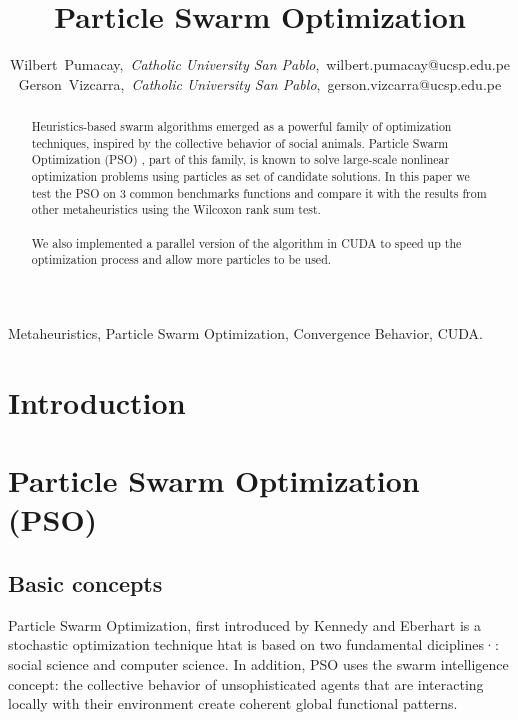 \documentclass[journal]{IEEEtran}
\begin{document}
\title{Particle Swarm Optimization}

\author{Wilbert~Pumacay,~\textit{Catholic University San Pablo},~wilbert.pumacay@ucsp.edu.pe\\
        Gerson~Vizcarra,~\textit{Catholic University San Pablo},~gerson.vizcarra@ucsp.edu.pe}

\maketitle

\begin{abstract}
Heuristics-based swarm algorithms emerged as a powerful family of optimization techniques, inspired by the collective behavior of social animals. Particle Swarm Optimization (PSO) , part of this family, is known to solve large-scale nonlinear optimization problems using particles as set of candidate solutions. In this paper we test the PSO on 3 common benchmarks functions and compare it with the results from other metaheuristics using the Wilcoxon rank sum test. 
\\
\\
We also implemented a parallel version of the algorithm in CUDA to speed up the optimization process and allow more particles to be used.
\end{abstract}

\begin{IEEEkeywords}
Metaheuristics, Particle Swarm Optimization, Convergence Behavior, CUDA.
\end{IEEEkeywords}


\section{Introduction}


\section{ Particle Swarm Optimization (PSO) }
\subsection{Basic concepts}
Particle Swarm Optimization, first introduced by Kennedy and Eberhart \cite{Kennedy1995} is a stochastic optimization technique htat is based on two fundamental diciplines·\cite{delValle2008}: social science and computer science. In addition, PSO uses the swarm intelligence concept: the collective behavior of unsophisticated agents that are interacting locally with their environment create coherent global functional patterns.
\end{document}
